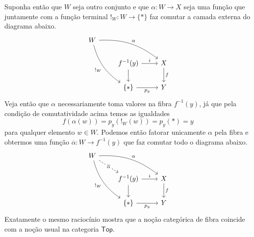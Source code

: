 \begin{exem}
\begin{enumerate}
    Suponha então que $W$ seja outro conjunto e que $\alpha: W \to X$ seja uma função que juntamente com a função terminal $!_{W}: W \to \{*\}$ faz comutar a camada externa do diagrama abaixo.
    \begin{displaymath}
      \begin{tikzcd}
        W
        \arrow[rrd, bend left=20, "\alpha"]
        \arrow[rdd, bend right=20, "!_{W}" swap]
        \\ & f^{-1}(y)
        \arrow[r, "i"]
        \arrow[d]
        & X
        \arrow[d, "f"]
        \\ & \{*\}
        \arrow[r, "p_{y}" swap]
        & Y
      \end{tikzcd}
    \end{displaymath}
    Veja então que $\alpha$ necessariamente toma valores na fibra $f^{-1}(y)$, já que pela condição de comutatividade acima temos as igualdades
    \begin{displaymath}
      f(\alpha(w)) = p_{y}(!_{W}(w)) = p_{y}(*) = y
    \end{displaymath}
    para qualquer elemento $w \in W$.
    Podemos então fatorar unicamente $\alpha$ pela fibra e obtermos uma função $\overline{\alpha}: W \to f^{-1}(y)$ que faz comutar todo o diagrama abaixo.
    \begin{displaymath}
      \begin{tikzcd}
        W
        \arrow[rrd, bend left=20, "\alpha"]
        \arrow[rdd, bend right=20, "!_{W}" swap]
        \arrow[rd, dashed, "\overline{\alpha}" description]
        \\ & f^{-1}(y)
        \arrow[r, "i"]
        \arrow[d]
        & X
        \arrow[d, "f"]
        \\ & \{*\}
        \arrow[r, "p_{y}" swap]
        & Y
      \end{tikzcd}
    \end{displaymath}
    Exatamente o mesmo raciocínio mostra que a noção categórica de fibra coincide com a noção usual na categoria $\mathsf{Top}$.
    

\end{enumerate}
\end{exem}

